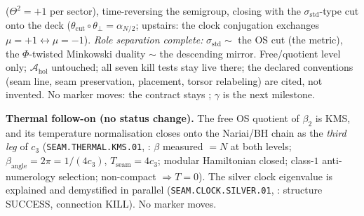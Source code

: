 ($\Theta^2=+1$ per sector), time-reversing the semigroup, closing with the
$\sigma_{\mathrm{std}}$-type cut onto the deck ($\theta_{\mathrm{cut}}\circ\theta_\perp
=\alpha_{N/2}$; upstairs: the clock conjugation exchanges $\mu=+1\leftrightarrow\mu=-1$).
\emph{Role separation complete:} $\sigma_{\mathrm{std}}\sim$ the OS cut (the metric), the
$\Phi$-twisted Minkowski duality $\sim$ the descending mirror.  Free/quotient level only;
$\mathcal A_{\mathrm{hol}}$ untouched; all seven kill tests stay live there; the declared
conventions (seam line, seam preservation, placement, torsor relabeling) are cited, not
invented.  No marker moves: the contract stays \mO; $\gamma$ is the next milestone.

\par\smallskip\noindent\textbf{Thermal follow-on (no status change).} The free OS quotient of
$\beta_2$ is KMS, and its temperature normalisation closes onto the Nariai/BH chain as the
\emph{third leg} of $c_3$ (\texttt{SEAM.THERMAL.KMS.01},
: $\beta$ measured $=N$ at both levels;
$\beta_{\mathrm{angle}}=2\pi=1/(4c_3)$, $T_{\mathrm{seam}}=4c_3$; modular Hamiltonian closed;
class-$1$ anti-numerology selection; non-compact $\Rightarrow T=0$). The silver clock
eigenvalue is explained and demystified in parallel (\texttt{SEAM.CLOCK.SILVER.01},
: structure SUCCESS, connection KILL). No marker
moves.

